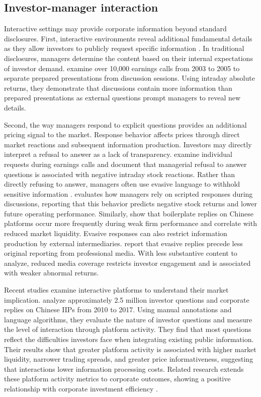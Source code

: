 \documentclass[12pt]{article}
\begin{document}
\subsection{Investor-manager interaction}

Interactive settings may provide corporate information beyond standard disclosures. First, interactive environments reveal additional fundamental details as they allow investors to publicly request specific information \citep{hollander2010}. In traditional disclosures, managers determine the content based on their internal expectations of investor demand. \citet{matsumoto2011} examine over 10,000 earnings calls from 2003 to 2005 to separate prepared presentations from discussion sessions. Using intraday absolute returns, they demonstrate that discussions contain more information than prepared presentations as external questions prompt managers to reveal new details.

Second, the way managers respond to explicit questions provides an additional pricing signal to the market. Response behavior affects prices through direct market reactions and subsequent information production. Investors may directly interpret a refusal to answer as a lack of transparency. \citet{hollander2010} examine individual requests during earnings calls and document that managerial refusal to answer questions is associated with negative intraday stock reactions. Rather than directly refusing to answer, managers often use evasive language to withhold sensitive information \citep{gow2021}. \citet{lee2016} evaluates how managers rely on scripted responses during discussions, reporting that this behavior predicts negative stock returns and lower future operating performance. Similarly, \citet{xie2023} show that boilerplate replies on Chinese platforms occur more frequently during weak firm performance and correlate with reduced market liquidity. Evasive responses can also restrict information production by external intermediaries. \citet{boustanifar2025} report that evasive replies precede less original reporting from professional media. With less substantive content to analyze, reduced media coverage restricts investor engagement and is associated with weaker abnormal returns.


Recent studies examine interactive platforms to understand their market implication. \citet{lee2022shall} analyze approximately 2.5 million investor questions and corporate replies on Chinese IIPs from 2010 to 2017. Using manual annotations and language algorithms, they evaluate the nature of investor questions and measure the level of interaction through platform activity. They find that most questions reflect the difficulties investors face when integrating existing public information. Their results show that greater platform activity is associated with higher market liquidity, narrower trading spreads, and greater price informativeness, suggesting that interactions lower information processing costs. Related research extends these platform activity metrics to corporate outcomes, showing a positive relationship with corporate investment efficiency \citep{xu2024}. 
\end{document}
